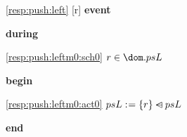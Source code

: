 \noindent \ref{resp:push:left} [r] \textbf{event}
\begin{block}
  \item   \textbf{during}
  \begin{block}
  \item[ \eqref{resp:push:leftm0:sch0} ]{$r \in \dom.psL $} %
  \end{block}
  \item   \textbf{begin}
  \begin{block}
  \item[ \eqref{resp:push:leftm0:act0} ]{$psL \mathrel{:\mkern1mu=} \{r\} \mathbin{\lhd\mkern-14mu-} psL $} %
  \end{block}
  \item   \textbf{end} \\
\end{block}
